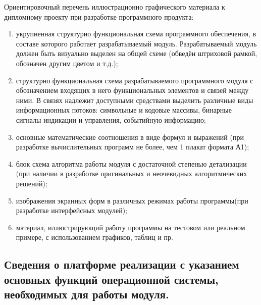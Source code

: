 Ориентировочный перечень иллюстрационно графического материала к дипломному проекту при разработке программного продукта:
\begin{enumerate}
\item  укрупненная структурно функциональная схема программного обеспечения, в составе которого работает разрабатываемый модуль. Разрабатываемый модуль должен быть визуально выделен на общей схеме (обведён штриховой рамкой, обозначен другим цветом и т.д.);
\item  структурно функциональная схема разрабатываемого программного модуля с обозначением входящих в него функциональных элементов и связей между ними. В связях надлежит доступными средствами выделить различные виды информационных потоков: символьные и кодовые массивы, бинарные сигналы индикации и управления, событийную информацию;
\item  основные математические соотношения в виде формул и выражений (при разработке вычислительных программ не более, чем 1 плакат формата А1);
\item  блок схема алгоритма работы модуля с достаточной степенью детализации (при наличии в разработке оригинальных и неочевидных алгоритмических решений);
\item  изображения экранных форм в различных режимах работы программы(при разработке интерфейсных модулей);
\item  материал, иллюстрирующий работу программы на тестовом или реальном примере, с использованием графиков, таблиц и пр.
\end{enumerate}

\subsection{Сведения о платформе реализации с указанием основных функций операционной системы, необходимых для работы модуля.}